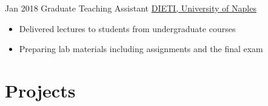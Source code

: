 \documentclass[letterpaper]{twentysecondcv} %
\begin{document}
\begin{twenty}
		{Jan 2018}
        {Graduate Teaching Assistant}
        {\href{http://www.scuolapsb.unina.it/}{DIETI, University of Naples}}
        {}
        {
            \begin{itemize}
                \item Delivered lectures to students from undergraduate courses
                \item Preparing lab materials including assignments and the final exam
            \end{itemize}
        }
\end{twenty}


\section{Projects}
\end{document}
